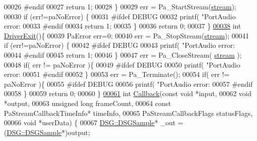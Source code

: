 \begin{DoxyCode}
{{00026 \textcolor{preprocessor}{#endif}
00027         \textcolor{keywordflow}{return} 1;
00028     \}
00029     err = Pa\_StartStream(\hyperlink{_driver_8cpp_aa2fbdaf8db29dee4b723a45b890cd92a}{stream});
00030     \textcolor{keywordflow}{if} (err!=paNoError) \{
00031 \textcolor{preprocessor}{#ifdef DEBUG}
00032         printf(  \textcolor{stringliteral}{"PortAudio error: %
00033 \textcolor{preprocessor}{#endif}
00034         \textcolor{keywordflow}{return} 1;
00035     \}
00036     \textcolor{keywordflow}{return} 0;
00037 \}
\hypertarget{_driver_8cpp_source_l00038}{}\hyperlink{_driver_8h_a0e985fca408fe471f534ee98a2bd5733}{00038} \textcolor{keywordtype}{int} \hyperlink{_driver_8cpp_a0e985fca408fe471f534ee98a2bd5733}{DriverExit}()\{
00039     PaError err=0;
00040     err = Pa\_StopStream(\hyperlink{_driver_8cpp_aa2fbdaf8db29dee4b723a45b890cd92a}{stream});
00041     \textcolor{keywordflow}{if} (err!=paNoError) \{
00042 \textcolor{preprocessor}{#ifdef DEBUG}
00043         printf(  \textcolor{stringliteral}{"PortAudio error: %
00044 \textcolor{preprocessor}{#endif}
00045         \textcolor{keywordflow}{return} 1;
00046     \}
00047     err = Pa\_CloseStream( \hyperlink{_driver_8cpp_aa2fbdaf8db29dee4b723a45b890cd92a}{stream} );
00048     \textcolor{keywordflow}{if}( err != paNoError )\{
00049 \textcolor{preprocessor}{#ifdef DEBUG}
00050         printf(  \textcolor{stringliteral}{"PortAudio error: %
00051 \textcolor{preprocessor}{#endif}
00052     \}
00053     err = Pa\_Terminate();
00054     \textcolor{keywordflow}{if}( err != paNoError )\{
00055 \textcolor{preprocessor}{#ifdef DEBUG}
00056         printf(  \textcolor{stringliteral}{"PortAudio error: %
00057 \textcolor{preprocessor}{#endif}
00058     \}
00059     \textcolor{keywordflow}{return} 0;
00060 \}
\hypertarget{_driver_8cpp_source_l00061}{}\hyperlink{_driver_8h_a110986770da2cd49dcf3789f8cc09c28}{00061} \textcolor{keywordtype}{int} \hyperlink{_driver_8cpp_a110986770da2cd49dcf3789f8cc09c28}{Callback}(\textcolor{keyword}{const} \textcolor{keywordtype}{void} *input,
00062              \textcolor{keywordtype}{void} *output,
00063              \textcolor{keywordtype}{unsigned} \textcolor{keywordtype}{long} frameCount,
00064              \textcolor{keyword}{const} PaStreamCallbackTimeInfo* timeInfo,
00065              PaStreamCallbackFlags statusFlags,
00066              \textcolor{keywordtype}{void} *userData) \{
00067     \hyperlink{namespace_d_s_g_ac39a94cd27ebcd9c1e7502d0c624894a}{DSG::DSGSample}* \_out = (\hyperlink{namespace_d_s_g_ac39a94cd27ebcd9c1e7502d0c624894a}{DSG::DSGSample}*)output;
}}}}}}
\end{DoxyCode}
